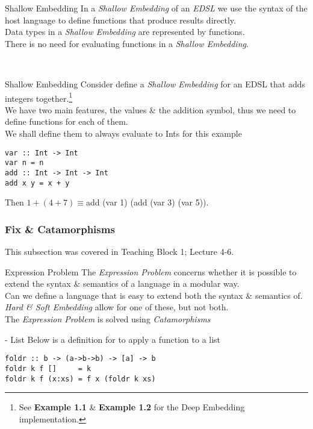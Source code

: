 \documentclass[11pt,a4paper]{article}
\begin{document}
\begin{definition}{Shallow Embedding}
In a \textit{Shallow Embedding} of an \textit{EDSL} we use the syntax of the host language to define functions that produce results directly.\\
Data types in a \textit{Shallow Embedding} are represented by functions.\\
\NB There is no need for evaluating functions in a \textit{Shallow Embedding}.
\end{definition}\\

\begin{example}{Shallow Embedding}
Consider define a \textit{Shallow Embedding} for an EDSL that adds integers together.\footnote{See \textbf{Example 1.1} \& \textbf{Example 1.2} for the Deep Embedding implementation.}\\
We have two main features, the values \& the addition symbol, thus we need to define functions for each of them.\\
We shall define them to always evaluate to Ints for this example
\begin{lstlisting}
var :: Int -> Int
var n = n
add :: Int -> Int -> Int
add x y = x + y
\end{lstlisting}
Then $1+(4+7)\equiv$add (var 1) (add (var 3) (var 5)).
\end{example}

\subsubsection{Fix \& Catamorphisms}
This subsection was covered in Teaching Block 1; Lecture 4-6.\\

\begin{remark}{Expression Problem}
The \textit{Expression Problem} concerns whether it is possible to extend the syntax \& semantics of a language in a modular way.\\
\ie Can we define a language that is easy to extend both the syntax \& semantics of.\\
\textit{Hard \& Soft Embedding} allow for one of these, but not both.\\
The \textit{Expression Problem} is solved using \textit{Catamorphisms}
\end{remark}

\begin{example}{{} - List}
Below is a definition for {} to apply a function to a list
\begin{lstlisting}
foldr :: b -> (a->b->b) -> [a] -> b
foldr k f []     = k
foldr k f (x:xs) = f x (foldr k xs)
\end{lstlisting}
\end{example}
\end{document}
